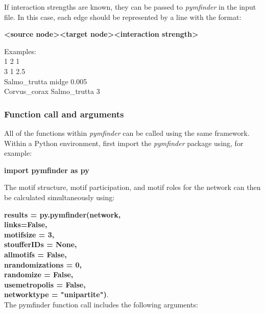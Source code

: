 \documentclass[12pt]{article}
\begin{document}
			If interaction strengths are known, they can be passed to \emph{pymfinder} in the input file. In this case, each edge should be represented by a line with the format:

			\textbf{\textless source node\textgreater \textless target node\textgreater \textless interaction strength\textgreater}

			Examples:\\
			1 2 1\\
			3 1 2.5\\
			Salmo\_trutta midge 0.005\\
			Corvus\_corax Salmo\_trutta 3\\

		\subsubsection{Function call and arguments}

			All of the functions within \emph{pymfinder} can be called using the same framework. Within a Python environment, first import the \emph{pymfinder} package using, for example:

			\textbf{import pymfinder as py}

			The motif structure, motif participation, and motif roles for the network can then be calculated simultaneously using:

			\textbf{results = py.pymfinder(network,\\
								links=False,\\
	              motifsize = 3,\\
	              stoufferIDs = None,\\
	              allmotifs = False,\\
	              nrandomizations = 0,\\
	              randomize = False,\\
	              usemetropolis = False,\\
	              networktype = "unipartite")}.\\


			The pymfinder function call includes the following arguments:
\end{document}
